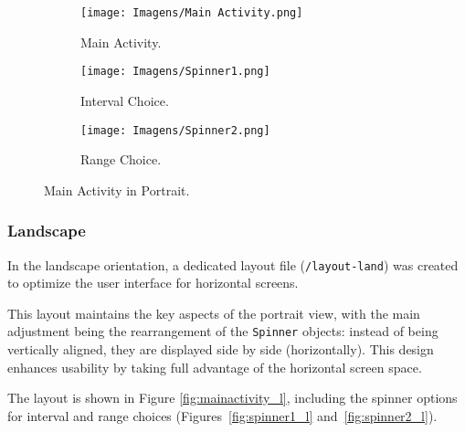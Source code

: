 \documentclass{article}
\begin{document}
\begin{figure}[ht]
    \centering
    
    \begin{subfigure}[t]{0.30\linewidth}
        \centering
        \texttt{[image: Imagens/Main Activity.png]}
        \caption{Main Activity.}
        \label{fig:mainactivity}
    \end{subfigure}
    \hfill
    \begin{subfigure}[t]{0.30\textwidth}
        \centering
        \texttt{[image: Imagens/Spinner1.png]}
        \caption{Interval Choice.}
        \label{fig:spinner1}
    \end{subfigure}
    \begin{subfigure}[t]{0.30\textwidth}
        \centering
        \texttt{[image: Imagens/Spinner2.png]}
        \caption{Range Choice.}
        \label{fig:spinner2}
    \end{subfigure}
    \caption{Main Activity in Portrait.}
    \label{fig:whole main activity}
\end{figure}
\subsubsection{Landscape}

In the landscape orientation, a dedicated layout file (\texttt{/layout-land}) was created to optimize the user interface for horizontal screens. 

This layout maintains the key aspects of the portrait view, with the main adjustment being the rearrangement of the \texttt{Spinner} objects: instead of being vertically aligned, they are displayed side by side (horizontally). This design enhances usability by taking full advantage of the horizontal screen space.

The layout is shown in Figure \ref{fig:mainactivity_l}, including the spinner options for interval and range choices (Figures~\ref{fig:spinner1_l} and~\ref{fig:spinner2_l}).
\end{document}

